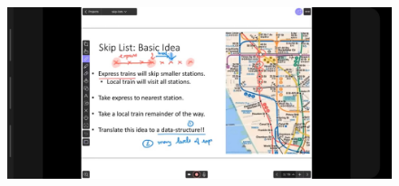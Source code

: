 \documentclass{article}
\begin{document}
\begin{figure}[H]
    \includegraphics[width=\textwidth]{skiplistmapexample.jpg}
\end{figure}
\end{document}
